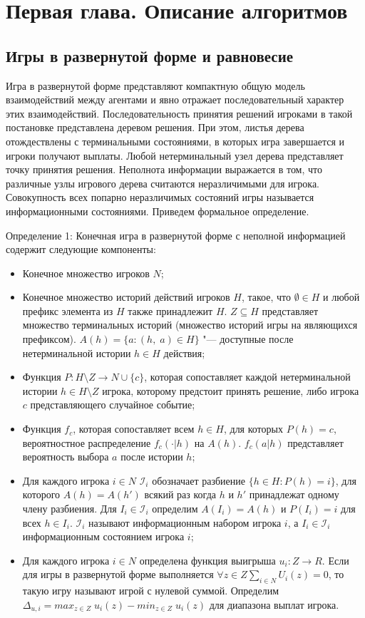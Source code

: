 \chapter{Первая глава. Описание алгоритмов}
\label{cha:ch_1}
\section{Игры в развернутой форме и равновесие}
\par
Игра в развернутой форме представляют компактную общую модель взаимодействий между агентами и явно отражает последовательный характер этих взаимодействий. Последовательность принятия решений игроками в такой постановке представлена деревом решения. При этом, листья дерева отождествлены с терминальными состояниями, в которых игра завершается и игроки получают выплаты. Любой нетерминальный узел дерева представляет точку принятия решения. Неполнота информации выражается в том, что различные узлы игрового дерева считаются неразличимыми для игрока. Совокупность всех попарно неразличимых состояний игры называется информационными состояниями. Приведем формальное определение.
\par
Определение 1: Конечная игра в развернутой форме с неполной информацией содержит следующие компоненты:
\begin{itemize}
	\item Конечное множество игроков $N$;
	\item Конечное множество историй действий игроков $H$, такое, что $\emptyset \in H$ и любой префикс элемента из $H$ также принадлежит $H$. $Z \subseteq H$ представляет множество терминальных историй (множество историй игры на являющихся префиксом). $A(h)=\{a \colon (h,\;a)\in H \}$ "--- доступные после нетерминальной истории $h\in H$ действия;
	\item Функция $P\colon H\setminus Z \to N \cup \{c\}$, которая сопоставляет каждой нетерминальной истории $h\in H\setminus Z$ игрока, которому предстоит принять решение, либо игрока $c$ представляющего случайное событие;
	\item Функция $f_c$, которая сопоставляет всем $h \in H$, для которых $P(h)=c$, вероятностное распределение $f_c(\cdot |h)$ на $A(h)$. $f_c(a|h)$ представляет вероятность выбора $a$ после истории $h$;
	\item Для каждого игрока $i \in N$ $\mathcal{I}_i $ обозначает разбиение $ \{h \in H \colon P(h) = i\}$, для которого $A(h)=A(h')$ всякий раз когда $h$ и $h'$ принадлежат одному члену разбиения. Для $I_i \in \mathcal{I}_i$ определим $A(I_i)=A(h)$ и $P(I_i)=i$ для всех $h \in I_i$. $\mathcal{I}_i$ называют информационным набором игрока $i$, а $I_i \in \mathcal{I}_i$ информационным состоянием игрока $i$;
	\item Для каждого игрока $i \in N$ определена функция выигрыша $u_i \colon Z \to R$. Если для игры в развернутой форме выполняется $\forall z \in Z \sum_{i \in N}U_i(z) = 0 $, то такую игру называют игрой с нулевой суммой. Определим $\Delta_{u,i} = max_{z\in Z}\;u_i(z) - min_{z\in Z}\;u_i(z)$ для диапазона выплат игрока. 
\end{itemize}
